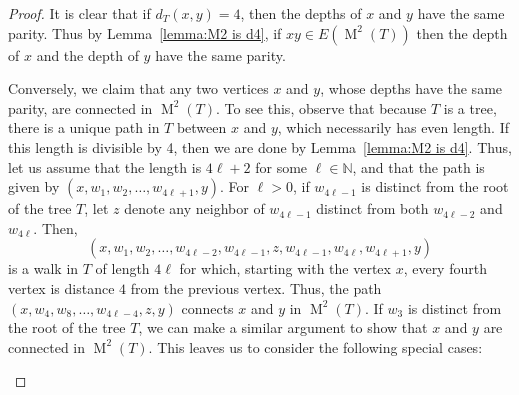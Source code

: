 \documentclass[12pt]{amsart}
\theoremstyle{definition}
\theoremstyle{remark}
\numberwithin{equation}{section}
\numberwithin{figure}{section}
\newcommand{\M}{\operatorname{M}}
\newcommand{\N}{\mathbb{N}}
\begin{document}
\begin{proof}
    It is clear that if $d_T(x,y) = 4$, then the depths of $x$ and $y$ have the same parity.
    Thus by Lemma~\ref{lemma:M2 is d4}, if $xy \in E(\M^2(T))$ then the depth of $x$ and the depth of $y$ have the same parity.
    
    Conversely, we claim that any two vertices $x$ and $y$, whose depths have the same parity, are connected in $\M^2(T)$.
    To see this, observe that because $T$ is a tree, there is a unique path in $T$ between $x$ and $y$, which necessarily has even length.
    If this length is divisible by 4, then we are done by Lemma~\ref{lemma:M2 is d4}.
    Thus, let us assume that the length is $4\ell+2$ for some $\ell \in \N$, and that the path is given by $(x,w_1,w_2,\ldots,w_{4\ell+1},y)$. For $\ell>0$, if $w_{4\ell-1}$ is distinct from the root of the tree $T$, let $z$ denote any neighbor of $w_{4\ell-1}$ distinct from both $w_{4\ell-2}$ and $w_{4\ell}$. Then,
    $$(x,w_1,w_2,\ldots,w_{4\ell-2},w_{4\ell-1},z,w_{4\ell-1},w_{4\ell},w_{4\ell+1},y)$$
    is a walk in $T$ of length $4\ell$ for which, starting with the vertex $x$, every fourth vertex is distance $4$ from the previous vertex. Thus, the path $(x,w_4,w_8,\ldots,w_{4\ell-4},z,y)$ connects $x$ and $y$ in $\M^2(T)$. If $w_{3}$ is distinct from the root of the tree $T$, we can make a similar argument to show that $x$ and $y$ are connected in $\M^2(T)$. This leaves us to consider the following special cases:

        \begin{figure}[h!]
    \centering
    \begin{subfigure}[b]{0.3\textwidth}
        \centering
        
        \caption{}
        \label{subfig:lemma94 1}
    \end{subfigure}
        \begin{subfigure}[b]{0.3\textwidth}
        \centering
        
        \caption{}
        \label{subfig:lemma94 2a}
    \end{subfigure}
        \begin{subfigure}[b]{0.3\textwidth}
        \centering
        
        \caption{}
        \label{subfig:lemma94 2b}
    \end{subfigure}
        \begin{subfigure}[b]{0.3\textwidth}
        \centering
        
        \caption{}
        \label{subfig:lemma94 3a}
    \end{subfigure}
        \begin{subfigure}[b]{0.3\textwidth}
        \centering
        
        \caption{}
        \label{subfig:lemma94 3b}
    \end{subfigure}


\end{figure}
\end{proof}
\end{document}
